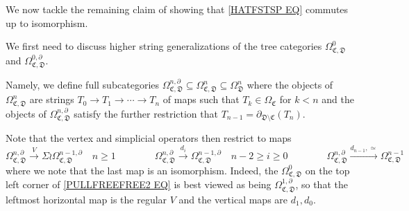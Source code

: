\documentclass[a4paper,10pt
,draft
]{article}%
\renewcommand{\1}{\eta}%
\begin{document}
We now tackle the remaining claim of showing that
\eqref{HATFSTSP EQ} commutes up to isomorphism.

We first need to discuss higher string generalizations of the tree categories 
$\Omega^{0}_{\mathfrak{C},\mathfrak{D}}$
and
$\Omega^{0,\partial}_{\mathfrak{C},\mathfrak{D}}$.

Namely, we define full subcategories 
$\Omega^{n,\partial}_{\mathfrak{C},\mathfrak{D}}
\subseteq
\Omega^{n}_{\mathfrak{C},\mathfrak{D}}
\subseteq
\Omega^{n}_{\mathfrak{D}}
$
where the objects of 
$\Omega^{n}_{\mathfrak{C},\mathfrak{D}}$
are strings $T_0 \to T_1 \to \cdots \to T_n$
of maps
such that $T_k \in \Omega_{\mathfrak{C}}$ for $k<n$
and the objects of 
$\Omega^{n,\partial}_{\mathfrak{C},\mathfrak{D}}$
satisfy the further restriction that
$T_{n-1}=\partial_{\mathfrak{D} \setminus \mathfrak{C}}(T_n)$.


Note that the vertex and simplicial operators then restrict to maps
\[
	\Omega_{\mathfrak{C},\mathfrak{D}}^{n, \partial} 
	\xrightarrow{V}
	\Sigma \wr \Omega_{\mathfrak{C},\mathfrak{D}}^{n-1, \partial} 
\quad
	n \geq 1
\qquad \qquad
	\Omega_{\mathfrak{C},\mathfrak{D}}^{n, \partial} 
	\xrightarrow{d_i}
	\Omega_{\mathfrak{C},\mathfrak{D}}^{n-1, \partial}
\quad
	n-2 \geq i \geq 0
\qquad \qquad
	\Omega_{\mathfrak{C},\mathfrak{D}}^{n, \partial} 
	\xrightarrow{d_{n-1},\simeq}
	\Omega_{\mathfrak{C},\mathfrak{D}}^{n-1}
\]
where we note that the last map is an isomorphism. 
Indeed, the $\Omega^0_{\mathfrak{C},\mathfrak{D}}$ 
on the top left corner of \eqref{PULLFREEFREE2 EQ} is best viewed as
being $\Omega^{1,\partial}_{\mathfrak{C},\mathfrak{D}}$, so that the leftmost horizontal map is the regular $V$ and the vertical maps are $d_1,d_0$.
\end{document}

